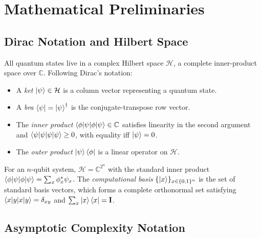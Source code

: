 \documentclass[aps, reprint, twocolumn, superscriptaddress, floatfix]{revtex4-2}
\begin{document}
\section{Mathematical Preliminaries}
\label{sec:math}

\subsection{Dirac Notation and Hilbert Space}
\label{ssec:dirac}

All quantum states live in a complex Hilbert space $\mathcal{H}$, a complete
inner-product space over $\mathbb{C}$.  Following Dirac's notation:
\begin{itemize}
  \item A \emph{ket} $\ket{\psi} \in \mathcal{H}$ is a column vector representing
        a quantum state.
  \item A \emph{bra} $\bra{\psi} = \ket{\psi}^\dagger$ is the conjugate-transpose
        row vector.
  \item The \emph{inner product} $\braket{\phi|\psi} \in \mathbb{C}$ satisfies
        linearity in the second argument and $\braket{\psi|\psi} \ge 0$, with
        equality iff $\ket{\psi} = 0$.
  \item The \emph{outer product} $\ket{\psi}\bra{\phi}$ is a linear operator on
        $\mathcal{H}$.
\end{itemize}
For an $n$-qubit system, $\mathcal{H} = \mathbb{C}^{2^n}$ with the standard
inner product $\braket{\phi|\psi} = \sum_x \phi_x^* \psi_x$.  The
\emph{computational basis} $\{\ket{x}\}_{x \in \{0,1\}^n}$ is the set of
standard basis vectors, which forms a complete orthonormal set satisfying
$\braket{x|y} = \delta_{xy}$ and $\sum_x \ket{x}\bra{x} = \mathbf{I}$.

\subsection{Asymptotic Complexity Notation}
\label{ssec:complexity-notation}
\end{document}

